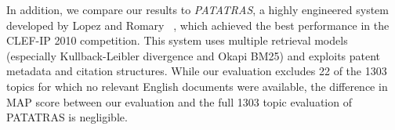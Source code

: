 In addition, we compare our results to \textit{PATATRAS}, a highly engineered system developed by Lopez and Romary~\cite{lopez2010experiments}
, which achieved the best performance in the CLEF-IP 2010 competition. This system uses multiple retrieval models (especially Kullback-Leibler divergence
and Okapi BM25) and exploits patent metadata and citation structures.  While our evaluation excludes 22 of the 1303 topics for which no relevant English documents were available, the difference in MAP score between our evaluation and the full 1303 topic evaluation of PATATRAS is negligible.
% 

